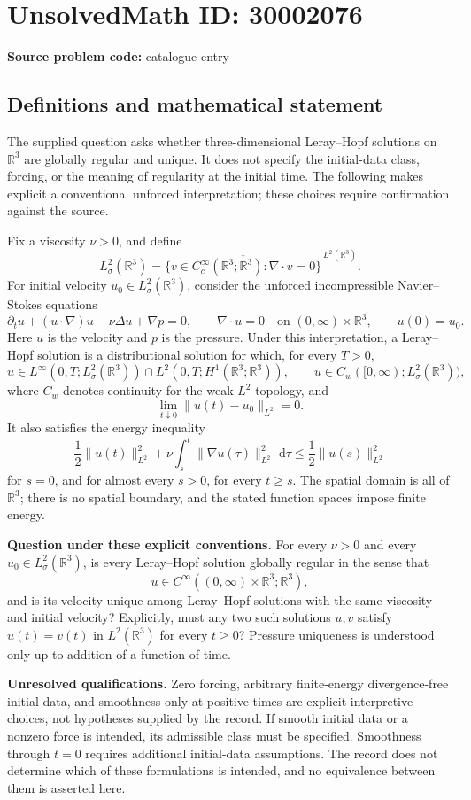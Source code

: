 \documentclass[11pt]{article}
\newcommand{\R}{\mathbb{R}}
\newcommand{\dd}{\,\mathrm{d}}
\begin{document}
\section*{UnsolvedMath ID: 30002076}
\textbf{Source problem code:} catalogue entry
\subsection{Definitions and mathematical statement}
The supplied question asks whether three-dimensional Leray--Hopf solutions on \(\R^3\) are globally regular and unique. It does not specify the initial-data class, forcing, or the meaning of regularity at the initial time. The following makes explicit a conventional unforced interpretation; these choices require confirmation against the source.

Fix a viscosity \(\nu>0\), and define
\[
L^2_\sigma(\R^3)=\overline{\{v\in C_c^\infty(\R^3;\R^3):\nabla\cdot v=0\}}^{\,L^2(\R^3)}.
\]
For initial velocity \(u_0\in L^2_\sigma(\R^3)\), consider the unforced incompressible Navier--Stokes equations
\[
\partial_t u+(u\cdot\nabla)u-\nu\Delta u+\nabla p=0,
\qquad \nabla\cdot u=0
\quad\text{on }(0,\infty)\times\R^3,
\qquad u(0)=u_0.
\]
Here \(u\) is the velocity and \(p\) is the pressure. Under this interpretation, a Leray--Hopf solution is a distributional solution for which, for every \(T>0\),
\[
u\in L^\infty(0,T;L^2_\sigma(\R^3))\cap L^2(0,T;H^1(\R^3;\R^3)),
\qquad u\in C_w([0,\infty);L^2_\sigma(\R^3)),
\]
where \(C_w\) denotes continuity for the weak \(L^2\) topology, and
\[
\lim_{t\downarrow0}\|u(t)-u_0\|_{L^2}=0.
\]
It also satisfies the energy inequality
\[
\frac12\|u(t)\|_{L^2}^2+\nu\int_s^t\|\nabla u(\tau)\|_{L^2}^2\,\dd\tau
\leq\frac12\|u(s)\|_{L^2}^2
\]
for \(s=0\), and for almost every \(s>0\), for every \(t\geq s\). The spatial domain is all of \(\R^3\); there is no spatial boundary, and the stated function spaces impose finite energy.

\textbf{Question under these explicit conventions.} For every \(\nu>0\) and every \(u_0\in L^2_\sigma(\R^3)\), is every Leray--Hopf solution globally regular in the sense that
\[
u\in C^\infty((0,\infty)\times\R^3;\R^3),
\]
and is its velocity unique among Leray--Hopf solutions with the same viscosity and initial velocity? Explicitly, must any two such solutions \(u,v\) satisfy \(u(t)=v(t)\) in \(L^2(\R^3)\) for every \(t\geq0\)? Pressure uniqueness is understood only up to addition of a function of time.

\textbf{Unresolved qualifications.} Zero forcing, arbitrary finite-energy divergence-free initial data, and smoothness only at positive times are explicit interpretive choices, not hypotheses supplied by the record. If smooth initial data or a nonzero force is intended, its admissible class must be specified. Smoothness through \(t=0\) requires additional initial-data assumptions. The record does not determine which of these formulations is intended, and no equivalence between them is asserted here.
\end{document}
